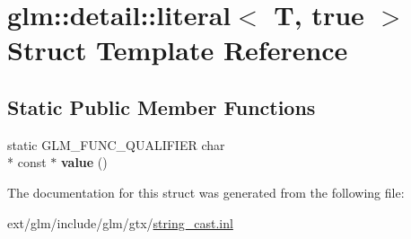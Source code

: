 \hypertarget{structglm_1_1detail_1_1literal_3_01_t_00_01true_01_4}{\section{glm\-:\-:detail\-:\-:literal$<$ T, true $>$ Struct Template Reference}
\label{structglm_1_1detail_1_1literal_3_01_t_00_01true_01_4}
}
\subsection*{Static Public Member Functions}
\begin{DoxyCompactItemize}
\item 
\hypertarget{structglm_1_1detail_1_1literal_3_01_t_00_01true_01_4_ae18b91cfeeb373f6b7c62572f88cf239}{static G\-L\-M\-\_\-\-F\-U\-N\-C\-\_\-\-Q\-U\-A\-L\-I\-F\-I\-E\-R char \\*
const $\ast$ {\bfseries value} ()}\label{structglm_1_1detail_1_1literal_3_01_t_00_01true_01_4_ae18b91cfeeb373f6b7c62572f88cf239}

\end{DoxyCompactItemize}


The documentation for this struct was generated from the following file\-:\begin{DoxyCompactItemize}
\item 
ext/glm/include/glm/gtx/\hyperlink{string__cast_8inl}{string\-\_\-cast.\-inl}\end{DoxyCompactItemize}
